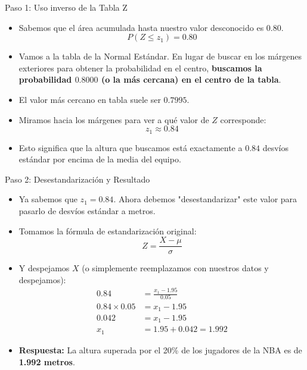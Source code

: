 \documentclass[11pt, aspectratio=169]{beamer}
\begin{document}
\begin{frame}{Paso 1: Uso inverso de la Tabla Z}
    \begin{itemize}
        \item Sabemos que el área acumulada hasta nuestro valor desconocido es $0.80$.
        \begin{equation*}
            P(Z \le z_1) = 0.80
        \end{equation*}
        \item Vamos a la tabla de la Normal Estándar. En lugar de buscar en los márgenes exteriores para obtener la probabilidad en el centro, \textbf{buscamos la probabilidad $0.8000$ (o la más cercana) en el centro de la tabla}.
        \item El valor más cercano en tabla suele ser $0.7995$.
        \item Miramos hacia los márgenes para ver a qué valor de $Z$ corresponde:
        \begin{equation*}
            z_1 \approx 0.84
        \end{equation*}
        \item Esto significa que la altura que buscamos está exactamente a $0.84$ desvíos estándar por encima de la media del equipo.
    \end{itemize}
\end{frame}

\begin{frame}{Paso 2: Desestandarización y Resultado}
    \begin{itemize}
        \item Ya sabemos que $z_1 = 0.84$. Ahora debemos "desestandarizar" este valor para pasarlo de desvíos estándar a metros.
        \item Tomamos la fórmula de estandarización original:
        \begin{equation*}
            Z = \frac{X - \mu}{\sigma}
        \end{equation*}
        \item Y despejamos $X$ (o simplemente reemplazamos con nuestros datos y despejamos):
        \begin{align*}
            0.84 &= \frac{x_1 - 1.95}{0.05} \\
            0.84 \times 0.05 &= x_1 - 1.95 \\
            0.042 &= x_1 - 1.95 \\
            x_1 &= 1.95 + 0.042 = \mathbf{1.992}
        \end{align*}
        \item \textbf{Respuesta:} La altura superada por el 20\% de los jugadores de la NBA es de \textbf{1.992 metros}.
    \end{itemize}
\end{frame}
\end{document}
